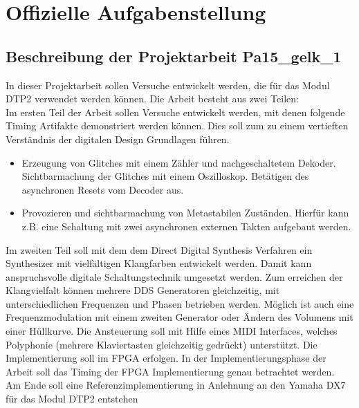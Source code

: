 


\appendix



\chapter{Offizielle Aufgabenstellung}\label{chap.anhang_aufgabenstellung}
\section*{Beschreibung der Projektarbeit Pa15\_gelk\_1}\label{sect.aufgabenstellung}

In dieser Projektarbeit sollen Versuche entwickelt werden, die für das Modul DTP2 verwendet werden können. Die Arbeit besteht aus zwei Teilen: \\
\newline
Im ersten Teil der Arbeit sollen Versuche entwickelt werden, mit denen folgende Timing Artifakte demonstriert werden können. Dies soll zum zu einem vertieften Verständnis der digitalen Design Grundlagen führen.
\newline
\begin{itemize}
	\item Erzeugung von Glitches mit einem Zähler und nachgeschaltetem Dekoder. Sichtbarmachung der Glitches mit einem Oszilloskop. Betätigen des asynchronen Resets vom Decoder aus. 

	\item Provozieren und sichtbarmachung von Metastabilen Zuständen. Hierfür kann z.B. eine Schaltung mit zwei asynchronen externen Takten aufgebaut werden. 
\end{itemize}
\bigskip
Im zweiten Teil soll mit dem dem Direct Digital Synthesis Verfahren ein Synthesizer mit vielfältigen Klangfarben entwickelt werden. Damit kann anspruchsvolle digitale Schaltungstechnik umgesetzt werden. Zum erreichen der Klangvielfalt können mehrere DDS Generatoren gleichzeitig, mit unterschiedlichen Frequenzen und Phasen betrieben werden. Möglich ist auch eine Frequenzmodulation mit einem zweiten Generator oder Ändern des Volumens mit einer Hüllkurve. Die Ansteuerung soll mit Hilfe eines MIDI Interfaces, welches Polyphonie (mehrere Klaviertasten gleichzeitig gedrückt) unterstützt. Die Implementierung soll im FPGA erfolgen. In der Implementierungsphase der Arbeit soll das Timing der FPGA Implementierung genau betrachtet werden.
\\[0.1cm]
Am Ende soll eine Referenzimplementierung in Anlehnung an den Yamaha DX7 für das Modul DTP2 entstehen 




